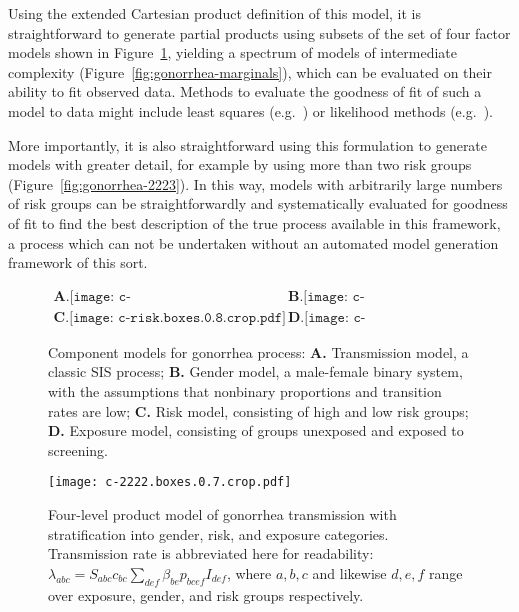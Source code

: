 \documentclass[review]{elsarticle}
\begin{document}
Using the extended Cartesian product definition of this model,
it is straightforward to generate partial products using subsets
of the set of four factor models shown in Figure~\ref{fig:gonorrhea-factors},
yielding a spectrum of models of intermediate complexity
(Figure~\ref{fig:gonorrhea-marginals}),
which can be evaluated on their ability to fit observed data.
Methods to evaluate the goodness of fit of such a model
to data might include least squares (e.g.\ \cite{hethcote2013modeling})
or likelihood methods (e.g.\ \cite{blok2017forecasting}).

More importantly, it is also straightforward using this formulation
to generate models with greater detail, for example by using more
than two risk groups (Figure~\ref{fig:gonorrhea-2223}).
In this way, models with arbitrarily large numbers of risk groups
can be straightforwardly and systematically evaluated for
goodness of fit to find the best description
of the true process available in this framework,
a process which can not be undertaken without an automated model
generation framework of this sort.



\begin{figure}
\[
\begin{array}{ll}
\textbf{A.}
\texttt{[image: c-transmission.boxes.crop.pdf]}

&
\textbf{B.}
\texttt{[image: c-gender.boxes.crop.pdf]}

\\
\textbf{C.}
\texttt{[image: c-risk.boxes.0.8.crop.pdf]}

&
\textbf{D.}
\texttt{[image: c-exp.boxes.crop.pdf]}

\end{array}
\]
\caption{\label{fig:gonorrhea-factors}
Component models for gonorrhea process:
\textbf{A.} Transmission model, a classic SIS process;
\textbf{B.} Gender model, a male-female binary system, with
the assumptions that nonbinary proportions and transition rates are low;
\textbf{C.} Risk model, consisting of high and low risk groups;
\textbf{D.} Exposure model, consisting of groups unexposed and exposed
to screening.}
\end{figure}

\begin{figure}
\centering
\texttt{[image: c-2222.boxes.0.7.crop.pdf]}

\caption{\label{fig:gonorrhea-product}
Four-level product model of gonorrhea transmission
with stratification into gender, risk, and exposure categories.
Transmission rate is abbreviated here for readability:
$\lambda_{abc}=S_{abc}c_{bc}\sum_{def}\beta_{be}p_{bcef}I_{def}$,
where $a,b,c$ and likewise $d,e,f$ range over exposure, gender,
and risk groups respectively.}
\end{figure}
\end{document}
